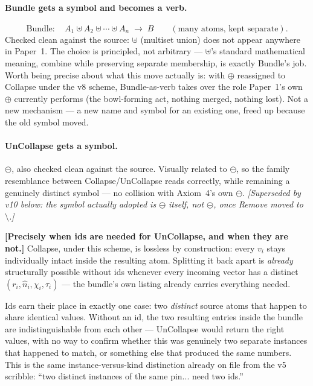 \documentclass[11pt]{article}
\begin{document}
\paragraph{Bundle gets a symbol and becomes a verb.}
\[
\text{Bundle}:\quad A_1 \uplus A_2 \uplus \cdots \uplus A_n
\;\longrightarrow\; B \qquad (\text{many atoms, kept separate}).
\]
Checked clean against the source: $\uplus$ (multiset union) does not
appear anywhere in Paper~1. The choice is principled, not arbitrary
--- $\uplus$'s standard mathematical meaning, combine while
preserving separate membership, is exactly Bundle's job. Worth being
precise about what this move actually is: with $\oplus$ reassigned to
Collapse under the v8 scheme, Bundle-as-verb takes over the role
Paper~1's own $\oplus$ currently performs (the bowl-forming act,
nothing merged, nothing lost). Not a new mechanism --- a new name and
symbol for an existing one, freed up because the old symbol moved.

\paragraph{UnCollapse gets a symbol.} $\circleddash$, also checked
clean against the source. Visually related to $\ominus$, so the
family resemblance between Collapse/UnCollapse reads correctly, while
remaining a genuinely distinct symbol --- no collision with Axiom~4's
own $\ominus$. \emph{[Superseded by v10 below: the symbol actually
adopted is $\ominus$ itself, not $\circleddash$, once Remove moved to
$\setminus$.]}

\textbf{[Precisely when ids are needed for UnCollapse, and when they
are not.]} Collapse, under this scheme, is lossless by construction:
every $v_i$ stays individually intact inside the resulting atom.
Splitting it back apart is \emph{already} structurally possible
without ids whenever every incoming vector has a distinct
$(r_i,\hat n_i,\chi_i,\tau_i)$ --- the bundle's own listing already
carries everything needed.

Ids earn their place in exactly one case: two \emph{distinct} source
atoms that happen to share identical values. Without an id, the two
resulting entries inside the bundle are indistinguishable from each
other --- UnCollapse would return the right values, with no way to
confirm whether this was genuinely two separate instances that
happened to match, or something else that produced the same numbers.
This is the same instance-versus-kind distinction already on file
from the v5 scribble: ``two distinct instances of the same pin...
need two ids.''
\end{document}
